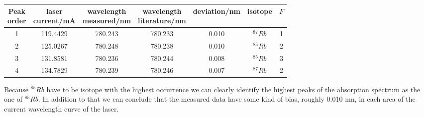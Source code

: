 \begin{center}
    \begin{tabular}{c | c | c c c | c c }
        \makecell{Peak\\order} & \makecell{laser\\current/mA} & \makecell{wavelength\\measured/nm} & \makecell{wavelength\\literature/nm} & deviation/nm & isotope & $F$ \\
        \hline
        1 & 119.4429 & 780.243 & 780.233 & 0.010 & $^{87}Rb$ & 1 \\
        2 & 125.0267 & 780.248 & 780.238 & 0.010 & $^{85}Rb$ & 2 \\
        3 & 131.8581 & 780.236 & 780.244 & 0.008 & $^{85}Rb$ & 3 \\
        4 & 134.7829 & 780.239 & 780.246 & 0.007 & $^{87}Rb$ & 2 \\       
    \end{tabular}
    \label{tab:identify}
\end{center}
Because $^{85}Rb$ have to be isotope with the highest occurrence we can clearly identify the highest peaks of the absorption spectrum as the one of $^{85}Rb$. In addition to that we can conclude that the measured data have some kind of bias, roughly 0.010 nm, in each area of the current wavelength curve of the laser.